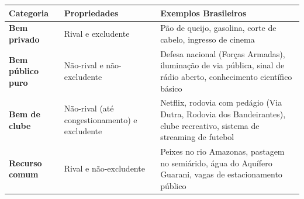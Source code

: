 \documentclass[11pt,twoside,openright]{book}
\begin{document}
{\def\LTcaptype{none} %
\begin{longtable}[]{@{}
  >{\raggedright\arraybackslash}p{}
  >{\raggedright\arraybackslash}p{}
  >{\raggedright\arraybackslash}p{}@{}}
\toprule\noalign{}
\begin{minipage}[b]{\linewidth}\raggedright
Categoria
\end{minipage} & \begin{minipage}[b]{\linewidth}\raggedright
Propriedades
\end{minipage} & \begin{minipage}[b]{\linewidth}\raggedright
Exemplos Brasileiros
\end{minipage} \\
\midrule\noalign{}
\endhead
\bottomrule\noalign{}
\endlastfoot
\textbf{Bem privado} & Rival e excludente & Pão de queijo, gasolina,
corte de cabelo, ingresso de cinema \\
\textbf{Bem público puro} & Não-rival e não-excludente & Defesa nacional
(Forças Armadas), iluminação de via pública, sinal de rádio aberto,
conhecimento científico básico \\
\textbf{Bem de clube} & Não-rival (até congestionamento) e excludente &
Netflix, rodovia com pedágio (Via Dutra, Rodovia dos Bandeirantes),
clube recreativo, sistema de streaming de futebol \\
\textbf{Recurso comum} & Rival e não-excludente & Peixes no rio
Amazonas, pastagem no semiárido, água do Aquífero Guarani, vagas de
estacionamento público \\
\end{longtable}
}
\end{document}
